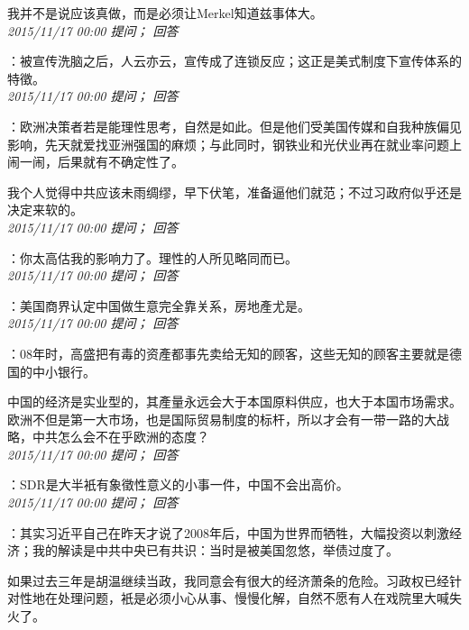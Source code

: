 \documentclass[twocolumn]{ctexart}
\begin{document}
我并不是说应该真做，而是必须让Merkel知道兹事体大。\\

\textit{\hfill\noindent\small 2015/11/17 00:00 提问； 回答}

：被宣传洗脑之后，人云亦云，宣传成了连锁反应；这正是美式制度下宣传体系的特徵。\\

\textit{\hfill\noindent\small 2015/11/17 00:00 提问； 回答}

：欧洲决策者若是能理性思考，自然是如此。但是他们受美国传媒和自我种族偏见影响，先天就爱找亚洲强国的麻烦；与此同时，钢铁业和光伏业再在就业率问题上闹一闹，后果就有不确定性了。

我个人觉得中共应该未雨绸缪，早下伏笔，准备逼他们就范；不过习政府似乎还是决定来软的。\\

\textit{\hfill\noindent\small 2015/11/17 00:00 提问； 回答}

：你太高估我的影响力了。理性的人所见略同而已。\\

\textit{\hfill\noindent\small 2015/11/17 00:00 提问； 回答}

：美国商界认定中国做生意完全靠关系，房地產尤是。\\

\textit{\hfill\noindent\small 2015/11/17 00:00 提问； 回答}

：08年时，高盛把有毒的资產都事先卖给无知的顾客，这些无知的顾客主要就是德国的中小银行。

中国的经济是实业型的，其產量永远会大于本国原料供应，也大于本国市场需求。欧洲不但是第一大市场，也是国际贸易制度的标杆，所以才会有一带一路的大战略，中共怎么会不在乎欧洲的态度？\\

\textit{\hfill\noindent\small 2015/11/17 00:00 提问； 回答}

：SDR是大半衹有象徵性意义的小事一件，中国不会出高价。\\

\textit{\hfill\noindent\small 2015/11/17 00:00 提问； 回答}

：其实习近平自己在昨天才说了2008年后，中国为世界而牺牲，大幅投资以刺激经济；我的解读是中共中央已有共识：当时是被美国忽悠，举债过度了。

如果过去三年是胡温继续当政，我同意会有很大的经济萧条的危险。习政权已经针对性地在处理问题，衹是必须小心从事、慢慢化解，自然不愿有人在戏院里大喊失火了。\\
\end{document}
